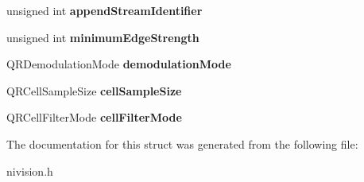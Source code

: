 \begin{DoxyCompactItemize}
\item 
\hypertarget{structQRCodeReport__struct_a771f4331b91e11ec2e8523d869969726}{unsigned int {\bfseries append\-Stream\-Identifier}}\label{structQRCodeReport__struct_a771f4331b91e11ec2e8523d869969726}

\item 
\hypertarget{structQRCodeReport__struct_adddbb26d772d60cd938b5eba1766b919}{unsigned int {\bfseries minimum\-Edge\-Strength}}\label{structQRCodeReport__struct_adddbb26d772d60cd938b5eba1766b919}

\item 
\hypertarget{structQRCodeReport__struct_ade39813e37228ee419f1a9446e01ff43}{\-Q\-R\-Demodulation\-Mode {\bfseries demodulation\-Mode}}\label{structQRCodeReport__struct_ade39813e37228ee419f1a9446e01ff43}

\item 
\hypertarget{structQRCodeReport__struct_a5d4f1639543c9d2eca5d3c4bfddc1ee6}{\-Q\-R\-Cell\-Sample\-Size {\bfseries cell\-Sample\-Size}}\label{structQRCodeReport__struct_a5d4f1639543c9d2eca5d3c4bfddc1ee6}

\item 
\hypertarget{structQRCodeReport__struct_a9b4111d1c50ec4f962dcc6e91f79a44e}{\-Q\-R\-Cell\-Filter\-Mode {\bfseries cell\-Filter\-Mode}}\label{structQRCodeReport__struct_a9b4111d1c50ec4f962dcc6e91f79a44e}

\end{DoxyCompactItemize}


\-The documentation for this struct was generated from the following file\-:\begin{DoxyCompactItemize}
\item 
nivision.\-h\end{DoxyCompactItemize}
